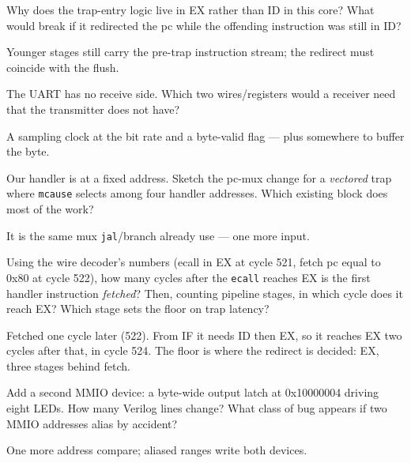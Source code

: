 \begin{exercise}[easy]

Why does the trap-entry logic live in EX rather than ID in this
core? What would break if it redirected the pc while the offending
instruction was still in ID?
\end{exercise}
\begin{solution}[hint]
Younger stages still carry the pre-trap instruction stream;
the redirect must coincide with the flush.
\end{solution}

\begin{exercise}[easy]

The UART has no receive side. Which two wires/registers would a
receiver need that the transmitter does not have?
\end{exercise}
\begin{solution}[hint]
A sampling clock at the bit rate and a byte-valid flag ---
plus somewhere to buffer the byte.
\end{solution}

\begin{exercise}[medium]

Our handler is at a fixed address. Sketch the pc-mux change for a
\emph{vectored} trap where \texttt{mcause} selects among four
handler addresses. Which existing block does most of the work?
\end{exercise}
\begin{solution}[hint]
It is the same mux \texttt{jal}/branch already use --- one
more input.
\end{solution}

\begin{exercise}[medium]

Using the wire decoder's numbers (ecall in EX at cycle 521, fetch pc
equal to 0x80 at cycle 522), how many cycles after the \texttt{ecall}
reaches EX is the first handler instruction \emph{fetched}? Then,
counting pipeline stages, in which cycle does it reach EX? Which
stage sets the floor on trap latency?
\end{exercise}
\begin{solution}[hint]
Fetched one cycle later (522). From IF it needs ID then EX, so it
reaches EX two cycles after that, in cycle 524. The floor is where the
redirect is decided: EX, three stages behind fetch.
\end{solution}

\begin{exercise}[medium]

Add a second MMIO device: a byte-wide output latch at
0x10000004 driving eight LEDs. How many Verilog lines change?
What class of bug appears if two MMIO addresses alias by accident?
\end{exercise}
\begin{solution}[hint]
One more address compare; aliased ranges write both devices.
\end{solution}

